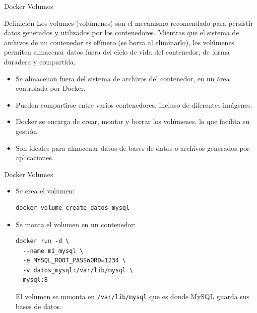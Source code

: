 \documentclass{beamer}
\begin{document}
\begin{frame}{Docker Volumes}

\begin{block}{Definición}
Los volumes (volúmenes) son el mecanismo recomendado para persistir datos generados y utilizados por los contenedores.
Mientras que el sistema de archivos de un contenedor es efímero (se borra al eliminarlo), los volúmenes permiten almacenar datos fuera del ciclo de vida del contenedor, de forma duradera y compartida.
\end{block}

\begin{itemize}
    \item Se almacenan fuera del sistema de archivos del contenedor, en un área controlada por Docker.
    \item Pueden compartirse entre varios contenedores, incluso de diferentes imágenes.
    \item Docker se encarga de crear, montar y borrar los volúmenes, lo que facilita su gestión.
    \item Son ideales para almacenar datos de bases de datos o archivos generados por aplicaciones.
\end{itemize}
    
\end{frame}


\begin{frame}[fragile]{Docker Volumes}

\begin{itemize}
    \item Se crea el volumen:
    \begin{verbatim}
docker volume create datos_mysql
\end{verbatim}
    \item Se monta el volumen en un contenedor:

\begin{verbatim}
docker run -d \
  --name mi_mysql \
  -e MYSQL_ROOT_PASSWORD=1234 \
  -v datos_mysql:/var/lib/mysql \
  mysql:8
\end{verbatim}

El volumen se mmonta en \texttt{/var/lib/mysql} que es donde MySQL guarda sus bases de datos.
    
\end{itemize}
    
\end{frame}
\end{document}

